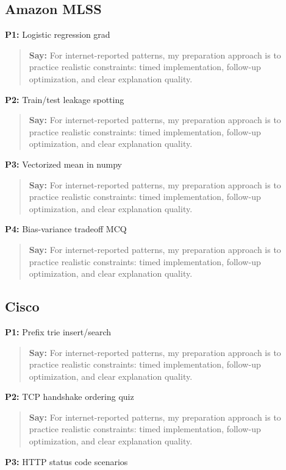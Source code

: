 \documentclass[9pt,a4paper]{article}
\begin{document}
\subsection{Amazon MLSS}
\textbf{P1:} Logistic regression grad

\begin{quote}\small\textbf{Say:} For internet-reported patterns, my preparation approach is to practice realistic constraints: timed implementation, follow-up optimization, and clear explanation quality.\end{quote}
\vspace{2mm}
\textbf{P2:} Train/test leakage spotting

\begin{quote}\small\textbf{Say:} For internet-reported patterns, my preparation approach is to practice realistic constraints: timed implementation, follow-up optimization, and clear explanation quality.\end{quote}
\vspace{2mm}
\textbf{P3:} Vectorized mean in numpy

\begin{quote}\small\textbf{Say:} For internet-reported patterns, my preparation approach is to practice realistic constraints: timed implementation, follow-up optimization, and clear explanation quality.\end{quote}
\vspace{2mm}
\textbf{P4:} Bias-variance tradeoff MCQ

\begin{quote}\small\textbf{Say:} For internet-reported patterns, my preparation approach is to practice realistic constraints: timed implementation, follow-up optimization, and clear explanation quality.\end{quote}
\vspace{2mm}
\subsection{Cisco}
\textbf{P1:} Prefix trie insert/search

\begin{quote}\small\textbf{Say:} For internet-reported patterns, my preparation approach is to practice realistic constraints: timed implementation, follow-up optimization, and clear explanation quality.\end{quote}
\vspace{2mm}
\textbf{P2:} TCP handshake ordering quiz

\begin{quote}\small\textbf{Say:} For internet-reported patterns, my preparation approach is to practice realistic constraints: timed implementation, follow-up optimization, and clear explanation quality.\end{quote}
\vspace{2mm}
\textbf{P3:} HTTP status code scenarios
\end{document}
